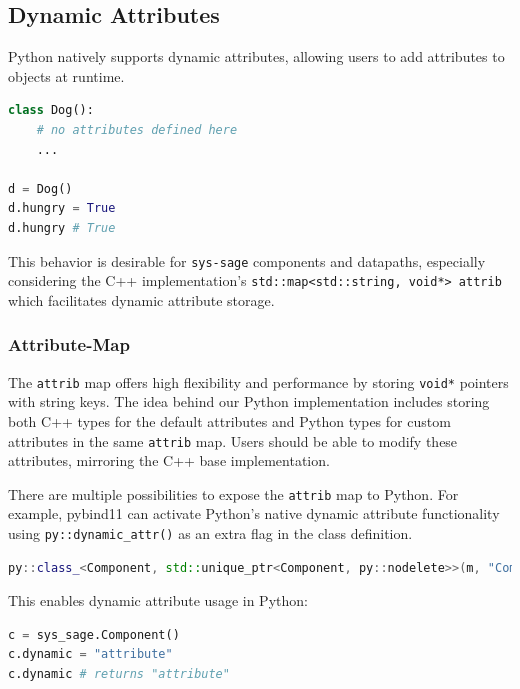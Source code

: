 \subsection{Dynamic Attributes}

Python natively supports dynamic attributes, allowing users to add attributes to objects at runtime.

\begin{lstlisting}[language=Python, xleftmargin=4em, frame = single]
class Dog():
    # no attributes defined here
    ...

d = Dog()
d.hungry = True
d.hungry # True
\end{lstlisting}

This behavior is desirable for \verb|sys-sage| components and datapaths, especially considering the C++ implementation's \verb|std::map<std::string, void*> attrib| which facilitates dynamic attribute storage.

\subsubsection{Attribute-Map}

The \verb|attrib| map offers high flexibility and performance by storing \verb|void*| pointers with string keys. The idea behind our Python implementation includes storing both C++ types for the default attributes and Python types for custom attributes in the same \verb|attrib| map. Users should be able to modify these attributes, mirroring the C++ base implementation.

There are multiple possibilities to expose the \verb|attrib| map to Python. For example, pybind11 can activate Python's native dynamic attribute functionality using \verb|py::dynamic_attr()| as an extra flag in the class definition. \cite[see The Basics/Object-Oriented Code]{pybind11-docu}

\begin{lstlisting}[language=C++, xleftmargin=4em, frame = single]
py::class_<Component, std::unique_ptr<Component, py::nodelete>>(m, "Component", py::dynamic_attr(),"Generic Component");
\end{lstlisting}

This enables dynamic attribute usage in Python:

\begin{lstlisting}[language=Python, xleftmargin=4em, frame = single]
c = sys_sage.Component()
c.dynamic = "attribute"
c.dynamic # returns "attribute"
\end{lstlisting}

